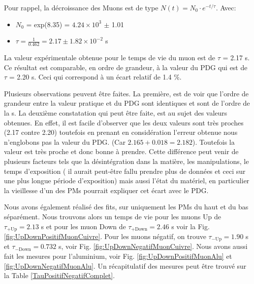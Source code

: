 \documentclass[12pt]{article}
\begin{document}
Pour rappel, la décroissance des Muons est de type $N(t) = N_{0}\cdot e^{-t/\tau}$. Avec:
    \begin{itemize}
        \item $N_{0}$ = exp(8.35) = $4.24\times10^{3}$ $\pm$ 1.01
        \item $\tau=\frac{1}{0.462} = 2.17 \pm 1.82\times10^{-2}$ \SIUnitSymbolMicro s
    \end{itemize}

La valeur expérimentale obtenue pour le temps de vie du muon est de $\tau$ = 2.17 \SIUnitSymbolMicro s. Ce résultat est comparable, en ordre de grandeur, à la valeur du PDG qui est de $\tau$ = 2.20 \SIUnitSymbolMicro s.  Ceci qui correspond à un écart relatif de 1.4 \%.

Plusieurs observations peuvent être faites. La première, est de voir que l'ordre de grandeur entre la valeur pratique et du PDG sont identiques et sont de l'ordre de la \SIUnitSymbolMicro s. La deuxième constatation qui peut être faite, est au sujet des valeurs obtenues. En effet, il est facile d'observer que les deux valeurs sont très proches (2.17 contre 2.20) toutefois en prenant en considération l'erreur obtenue nous n'englobons pas la valeur du PDG. (Car $2.165+0.018=2.182$). Toutefois la valeur est très proche et donc bonne à prendre. Cette différence peut venir de plusieurs facteurs tels que la désintégration dans la matière, les manipulations, le temps d'exposition ( il aurait peut-être fallu prendre plus de données et ceci sur une plus longue période d'exposition) mais aussi l'état du matériel, en particulier la vieillesse d'un des PMs pourrait expliquer cet écart avec le PDG.

Nous avons également réalisé des fits, sur uniquement les PMs du haut et du bas séparément. Nous trouvons alors un temps de vie pour les muons Up de
$\tau_{+\text{Up}}=2.13$ \SIUnitSymbolMicro s et pour les muon  Down de $\tau_{+\text{Down}}=2.46$ \SIUnitSymbolMicro s voir la Fig. \ref{fig:UpDownPositifMuonCuivre}. Pour les muons négatif, on trouve $\tau_{-\text{Up}}=1.90$ \SIUnitSymbolMicro s et $\tau_{-\text{Down}}=0.732$ \SIUnitSymbolMicro s, voir Fig. \ref{fig:UpDownNegatifMuonCuivre}. Nous avons aussi fait les mesures pour l'aluminium, voir Fig. \ref{fig:UpDownPositifMuonAlu} et \ref{fig:UpDownNegatifMuonAlu}. Un récapitulatif des mesures peut être trouvé sur la Table \ref{TauPositifNegatifComplet}.
\end{document}
